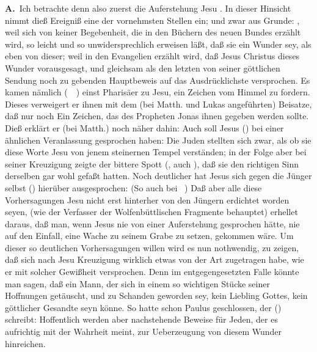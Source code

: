 \vabst\textbf{A.}~Ich betrachte denn also zuerst die Auferstehung Jesu . In dieser Hinsicht nimmt dieß Ereigniß eine der vornehmsten Stellen ein; und zwar aus  Grunde: , weil sich von keiner Begebenheit, die in den Büchern des neuen Bundes erzählt wird, so leicht und so unwidersprechlich erweisen läßt, daß sie ein Wunder sey, als eben von dieser;  weil in den Evangelien erzählt wird, daß Jesus Christus dieses Wunder vorausgesagt, und gleichsam als den letzten von seiner göttlichen Sendung noch zu gebenden Hauptbeweis auf das Ausdrücklichste versprochen. Es kamen nämlich (\ \ ) einst Pharisäer zu Jesu, ein Zeichen vom Himmel zu fordern. Dieses verweigert er ihnen mit dem (bei Matth. und Lukas angeführten) Beisatze, daß nur noch Ein Zeichen, das des Propheten Jonas ihnen gegeben werden sollte. Dieß erklärt er (bei Matth.) noch näher dahin:  Auch soll Jesus () bei einer ähnlichen Veranlassung gesprochen haben:  Die Juden stellten sich zwar, als ob sie diese Worte Jesu von jenem steinernen Tempel verständen; in der Folge aber bei seiner Kreuzigung zeigte der bittere Spott (, auch ), daß sie den richtigen Sinn derselben gar wohl gefaßt hatten. Noch deutlicher hat Jesus sich gegen die Jünger selbst () hierüber ausgesprochen:  (So auch bei \ \uaO ) Daß aber alle diese Vorhersagungen Jesu nicht erst hinterher von den Jüngern erdichtet worden seyen, (wie der Verfasser der Wolfenbüttlischen Fragmente behauptet) erhellet daraus, daß man, wenn Jesus nie von einer Auferstehung gesprochen hätte, nie auf den Einfall, eine Wache zu seinem Grabe zu setzen, gekommen wäre. Um dieser so deutlichen Vorhersagungen willen wird es nun nothwendig, zu zeigen, daß sich nach Jesu Kreuzigung wirklich etwas von der Art zugetragen habe, wie er mit solcher Gewißheit versprochen. Denn im entgegengesetzten Falle könnte man sagen, daß ein Mann, der sich in einem so wichtigen Stücke seiner Hoffnungen getäuscht, und zu Schanden geworden sey, kein Liebling Gottes, kein göttlicher Gesandte seyn könne. So hatte schon Paulus geschlossen, der () schreibt:  Hoffentlich werden aber nachstehende  Beweise für Jeden, der es aufrichtig mit der Wahrheit meint, zur Ueberzeugung von diesem Wunder hinreichen.~\par

